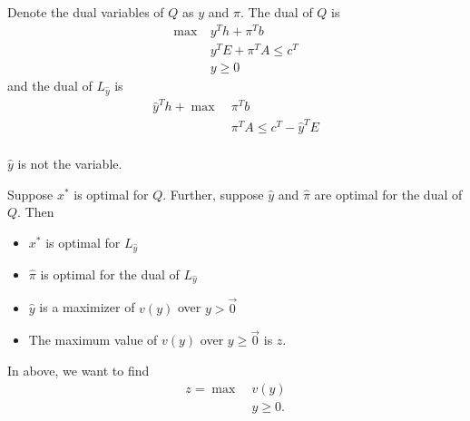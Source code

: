 Denote the dual variables of \(Q\) as \(y\) and \(\pi\). The dual of \(Q\) is
\begin{align*}
	\max~ & y^{T}h + \pi^{T} b          \\
	      & y^{T}E + \pi^{T}A\leq c^{T} \\
	      & y\geq 0
\end{align*}
and the dual of \(L_{\hat{y}}\) is
\begin{align*}
	\hat{y}^{T}h + \max~ & \pi^{T}b                          \\
	                     & \pi^{T}A\leq c^{T} - \hat{y}^{T}E \\
\end{align*}
\begin{note}
	\(\hat{y}\) is not the variable.
\end{note}

\begin{theorem}
	\label{lagrangian dual}
	Suppose \(x^{*}\) is optimal for \(Q\). Further, suppose \(\hat{y}\) and \(\hat{\pi}\) are optimal for the dual of \(Q\).
	Then
	\begin{itemize}
		\item \(x^{*}\) is optimal for \(L_{\hat{y}}\)
		\item \(\hat{\pi}\) is optimal for the dual of \(L_{\hat{y}}\)
		\item \(\hat{y}\) is a maximizer of \(v(y)\) over \(y>\vec{0}\)
		\item The maximum value of \(v(y)\) over \(y\geq \vec{0}\) is \(z\).
	\end{itemize}
\end{theorem}
\begin{note}
	In above, we want to find
	\begin{align*}
		z = \max~ & v(y)     \\
		          & y\geq 0.
	\end{align*}
\end{note}

